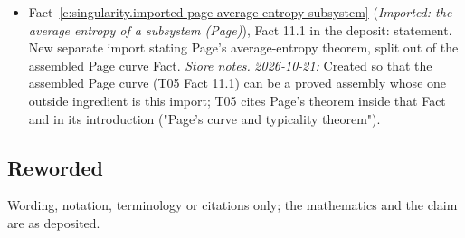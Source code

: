 \documentclass[11pt]{article}
\theoremstyle{definition}
\theoremstyle{plain}
\begin{document}
\begin{itemize}
\item Fact~\ref{c:singularity.imported-page-average-entropy-subsystem} (\emph{Imported: the average entropy of a subsystem (Page)}), Fact 11.1 in the deposit: statement. New separate import stating Page's average-entropy theorem, split out of the assembled Page curve Fact. \emph{Store notes.} \emph{2026-10-21:} Created so that the assembled Page curve (T05 Fact 11.1) can be a proved assembly whose one outside ingredient is this import; T05 cites Page's theorem inside that Fact and in its introduction ("Page's curve and typicality theorem").
\end{itemize}
\subsection*{Reworded}
Wording, notation, terminology or citations only; the mathematics and the claim are as deposited.
\end{document}
